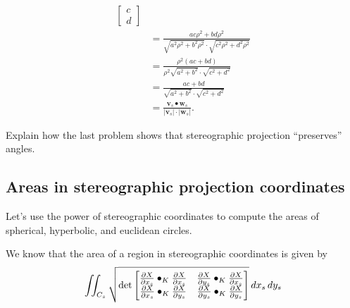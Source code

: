 \documentclass[newpage,hints,handout]{ximera}
\begin{document}
\begin{problem}
\begin{freeResponse}
\begin{align*}
{{\begin{bmatrix}
            c\\
            d
          \end{bmatrix}}
        }\\
        &= \frac{ac\rho^2 + bd\rho^2}{\sqrt{a^2\rho^2+b^2\rho^2}\cdot \sqrt{c^2\rho^2+d^2\rho^2}}\\
        &= \frac{\rho^2(ac + bd)}{\rho^2\sqrt{a^2+b^2}\cdot \sqrt{c^2+d^2}}\\
        &= \frac{ac + bd}{\sqrt{a^2+b^2}\cdot \sqrt{c^2+d^2}}\\
        &=\frac{\mathbf{v}_s\bullet \mathbf{w}_s}{|\mathbf{v}_s|\cdot|\mathbf{w}_s|}.
    \end{align*}
  \end{freeResponse}
\end{problem}


\begin{problem}
  Explain how the last problem shows that stereographic projection
  ``preserves'' angles. 
\end{problem}




















\subsection{Areas in stereographic projection coordinates}

Let's use the power of stereographic coordinates to compute the areas
of spherical, hyperbolic, and euclidean circles.

We know that the area of a region in stereographic coordinates is given by 
\[
\iint_{C_s} \sqrt{
  \det
  \begin{bmatrix}
    \pp[X]{x_s}\bullet_K \pp[X]{x_s} & \pp[X]{y_s}\bullet_K \pp[X]{x_s} \\
    \pp[X]{x_s}\bullet_K \pp[X]{y_s} & \pp[X]{y_s}\bullet_K \pp[X]{y_s}
  \end{bmatrix}
}\d x_s\d y_s
\]
\end{document}
